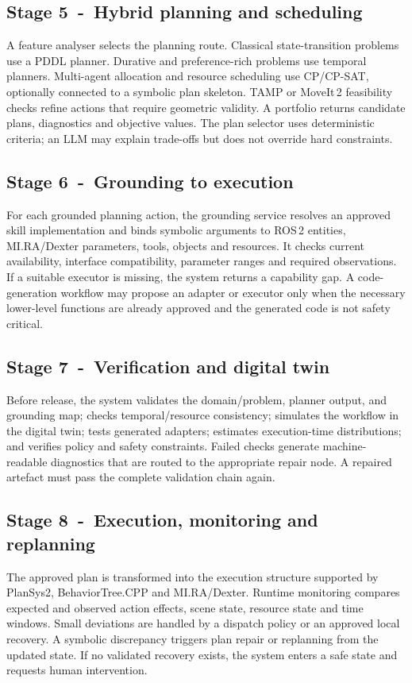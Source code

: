 \documentclass{plan4ari_report}
\begin{document}
\subsection{Stage 5~-~Hybrid planning and scheduling}
A feature analyser selects the planning route. Classical state-transition problems use a PDDL planner. Durative and preference-rich problems use temporal planners. Multi-agent allocation and resource scheduling use CP/CP-SAT, optionally connected to a symbolic plan skeleton. TAMP or MoveIt\,2 feasibility checks refine actions that require geometric validity. A portfolio returns candidate plans, diagnostics and objective values. The plan selector uses deterministic criteria; an LLM may explain trade-offs but does not override hard constraints.

\subsection{Stage 6~-~Grounding to execution}
For each grounded planning action, the grounding service resolves an approved skill implementation and binds symbolic arguments to ROS\,2 entities, MI.RA/Dexter parameters, tools, objects and resources. It checks current availability, interface compatibility, parameter ranges and required observations. If a suitable executor is missing, the system returns a capability gap. A code-generation workflow may propose an adapter or executor only when the necessary lower-level functions are already approved and the generated code is not safety critical.

\subsection{Stage 7~-~Verification and digital twin}
Before release, the system validates the domain/problem, planner output, and grounding map; checks temporal/resource consistency; simulates the workflow in the digital twin; tests generated adapters; estimates execution-time distributions; and verifies policy and safety constraints. Failed checks generate machine-readable diagnostics that are routed to the appropriate repair node. A repaired artefact must pass the complete validation chain again.

\subsection{Stage 8~-~Execution, monitoring and replanning}
The approved plan is transformed into the execution structure supported by PlanSys2, BehaviorTree.CPP and MI.RA/Dexter. Runtime monitoring compares expected and observed action effects, scene state, resource state and time windows. Small deviations are handled by a dispatch policy or an approved local recovery. A symbolic discrepancy triggers plan repair or replanning from the updated state. If no validated recovery exists, the system enters a safe state and requests human intervention.
\end{document}
